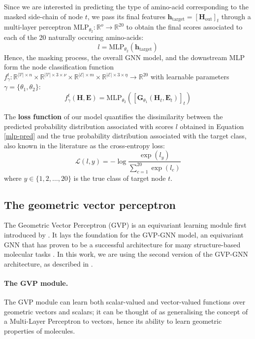 Since we are interested in predicting the type of amino-acid corresponding to the masked side-chain of node $t$, we pass its final features $\mathbf{h}_{\text{target}} = [\mathbf{H}_{\text{out}}]_{t}$ through a multi-layer perceptron $\text{MLP}_{\theta_2}:\mathbb{R}^o\rightarrow \mathbb{R}^{20}$ to obtain the final scores associated to each of the 20 naturally occuring amino-acids:
\begin{equation}
    l = \text{MLP}_{\theta_2}(\mathbf{h}_{\text{target}})
\label{mlp-pred}
\end{equation}
Hence, the masking process, the overall GNN model, and the downstream MLP form the node classification function $f_{\gamma}^t:\mathbb{R}^{|\mathcal{V}|\times n}\times\mathbb{R}^{|\mathcal{V}|\times 3 \times \nu}\times\mathbb{R}^{|\mathcal{E}|\times m}\times\mathbb{R}^{|\mathcal{E}|\times 3 \times \eta}\rightarrow \mathbb{R}^{20}$ with learnable parameters $\gamma = \{\theta_1, \theta_2\}$:
\begin{equation}
    f_{\gamma}^t(\mathbf{H}, \mathbf{E}) = \text{MLP}_{\theta_2}([\mathbf{G}_{\theta_1}(\mathbf{H}_t, \mathbf{E}_t)]_t)
\label{full-formalism}
\end{equation}

The \textbf{loss function} of our model quantifies the dissimilarity between the predicted probability distribution associated with scores $l$ obtained in Equation \ref{mlp-pred} and the true probability distribution associated with the target class, also known in the literature as the cross-entropy loss:
\begin{equation}
    \mathcal{L}(l, y) = -\log\frac{\exp({l_y})}{\sum_{c=1}^{20} \exp({l_c})}
\label{logits}
\end{equation}
where $y \in \{1,2,\dots,20\}$ is the true class of target node $t$.
\subsection{The geometric vector perceptron}
\label{the-gvp-math}
The Geometric Vector Perceptron (GVP) is an equivariant learning module first introduced by \citet{gvp1}. It lays the foundation for the GVP-GNN model, an equivariant GNN that has proven to be a successful architecture for many structure-based molecular tasks \cite{gvp1, gvp2}. In this work, we are using the second version of the GVP-GNN architecture, as described in \citet{gvp2}. 

\paragraph{The GVP module.}
The GVP module can learn both scalar-valued and vector-valued functions over geometric vectors and scalars; it can be thought of as generalising the concept of a Multi-Layer Perceptron to vectors, hence its ability to learn geometric properties of molecules. 

